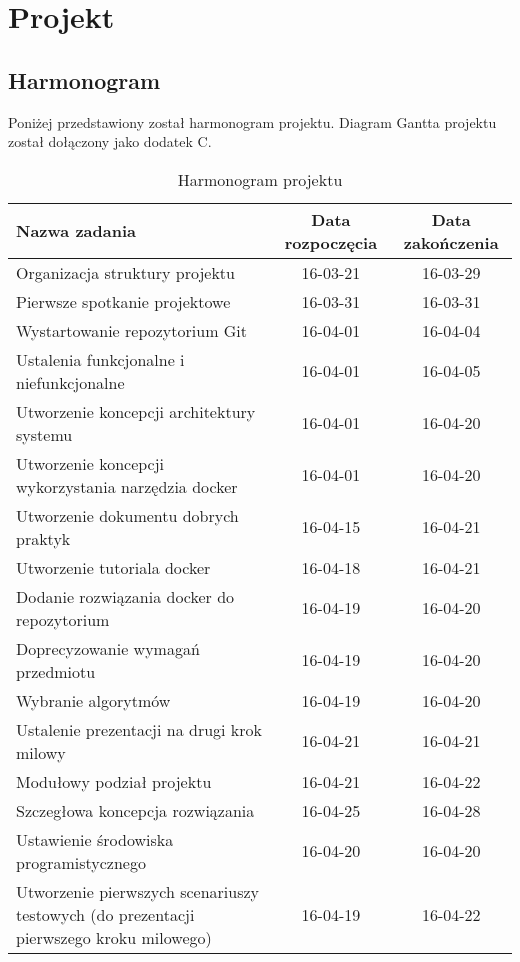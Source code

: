 \chapter{Projekt}


\section{Harmonogram}
Poniżej przedstawiony został harmonogram projektu. Diagram Gantta projektu został dołączony jako dodatek C.
\begin{table}[!h]
\caption{Harmonogram projektu}
\label{tab:harmonogram}
  \begin{center}
  \begin{tabular}{ p{8cm} || c | c }
\textbf{Nazwa zadania} & \textbf{Data rozpoczęcia} & \textbf{Data zakończenia} \\ \hline
Organizacja struktury projektu & 16-03-21 & 16-03-29 \\ \hline
Pierwsze spotkanie projektowe & 16-03-31 & 16-03-31 \\ \hline
Wystartowanie repozytorium Git & 16-04-01 & 16-04-04 \\ \hline
Ustalenia funkcjonalne i niefunkcjonalne & 16-04-01 & 16-04-05 \\ \hline
Utworzenie koncepcji architektury systemu & 16-04-01 & 16-04-20 \\ \hline
Utworzenie koncepcji wykorzystania narzędzia docker & 16-04-01 & 16-04-20 \\ \hline
Utworzenie dokumentu dobrych praktyk & 16-04-15 & 16-04-21 \\ \hline
Utworzenie tutoriala docker & 16-04-18 & 16-04-21 \\ \hline
Dodanie rozwiązania docker do repozytorium & 16-04-19 & 16-04-20 \\ \hline
Doprecyzowanie wymagań przedmiotu & 16-04-19 & 16-04-20 \\ \hline
Wybranie algorytmów & 16-04-19 & 16-04-20 \\ \hline
Ustalenie prezentacji na drugi krok milowy & 16-04-21 & 16-04-21 \\ \hline
Modułowy podział projektu & 16-04-21 & 16-04-22 \\ \hline
Szczegłowa koncepcja rozwiązania & 16-04-25 & 16-04-28 \\ \hline
Ustawienie środowiska programistycznego & 16-04-20 & 16-04-20 \\ \hline
Utworzenie pierwszych scenariuszy testowych (do prezentacji pierwszego kroku milowego) & 16-04-19 & 16-04-22 \\ \hline

\end{tabular}
\end{center}
\end{table}
